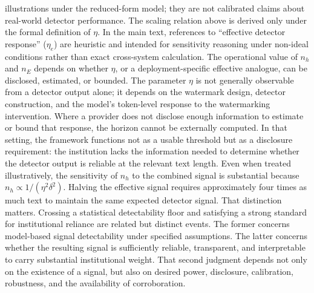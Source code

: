 \documentclass[11pt]{article}
\begin{document}
illustrations under the reduced-form model; they are not calibrated claims about
real-world detector performance.
The scaling relation above is derived only under the formal definition of $\eta$.
In the main text, references to ``effective detector response'' ($\eta_{e}$) are
heuristic and intended for sensitivity reasoning under non-ideal conditions rather
than exact cross-system calculation.
The operational value of $n_h$ and $n_E$ depends on whether $\eta$, or a
deployment-specific effective analogue, can be disclosed, estimated, or bounded. The parameter $\eta$ is not
generally observable from a detector output alone; it depends on the watermark
design, detector construction, and the model's token-level response to the
watermarking intervention. Where a provider does not disclose enough information to
estimate or bound that response, the horizon cannot be externally computed. In that
setting, the framework functions not as a usable threshold but as a disclosure
requirement: the institution lacks the information needed to determine whether the
detector output is reliable at the relevant text length.
Even when treated illustratively, the sensitivity of $n_h$ to the combined signal
is substantial because $n_h \propto 1/(\eta^2\delta^2)$. Halving the effective
signal requires approximately four times as much text to maintain the same expected
detector signal.
That distinction matters. Crossing a statistical detectability floor and satisfying
a strong standard for institutional reliance are related but distinct events. The
former concerns model-based signal detectability under specified assumptions. The
latter concerns whether the resulting signal is sufficiently reliable, transparent,
and interpretable to carry substantial institutional weight. That second judgment
depends not only on the existence of a signal, but also on desired power,
disclosure, calibration, robustness, and the availability of corroboration.
\end{document}
